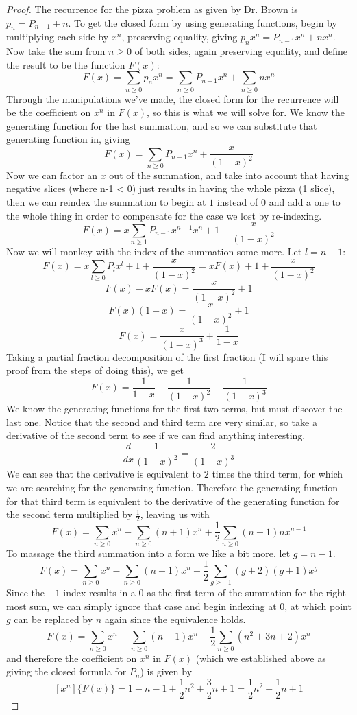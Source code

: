 \documentclass[12pt]{article}
\begin{document}
\begin{proof}
The recurrence for the pizza problem as given by Dr. Brown is $p_n=P_{n-1}+n$. To get the closed form by using generating functions, begin by multiplying each side by $x^n$, preserving equality, giving $p_nx^n=P_{n-1}x^n+nx^n$. Now take the sum from $n \geq 0$ of both sides, again preserving equality, and define the result to be the function $F(x)$:
\[F(x)=\sum_{n \geq 0}p_nx^n=\sum_{n \geq 0}P_{n-1}x^n+\sum_{n \geq 0}nx^n\]
Through the manipulations we've made, the closed form for the recurrence will be the coefficient on $x^n$ in $F(x)$, so this is what we will solve for. We know the generating function for the last summation, and so we can substitute that generating function in, giving
\[F(x)=\sum_{n \geq 0}P_{n-1}x^n+\frac{x}{(1-x)^2}\]
Now we can factor an $x$ out of the summation, and take into account that having negative slices (where n-1 < 0) just results in having the whole pizza (1 slice), then we can reindex the summation to begin at $1$ instead of $0$ and add a one to the whole thing in order to compensate for the case we lost by re-indexing.
\[F(x)=x\sum_{n \geq 1}P_{n-1}x^{n-1}x^n+1+\frac{x}{(1-x)^2}\]
Now we will monkey with the index of the summation some more. Let $l=n-1$:
\[F(x)=x\sum_{l \geq 0}P_lx^l+1+\frac{x}{(1-x)^2} = xF(x)+1+\frac{x}{(1-x)^2}\]
\[F(x)-xF(x)=\frac{x}{(1-x)^2}+1\]
\[F(x)(1-x)=\frac{x}{(1-x)^2}+1\]
\[F(x)=\frac{x}{(1-x)^3}+\frac{1}{1-x}\]
Taking a partial fraction decomposition of the first fraction (I will spare this proof from the steps of doing this), we get
\[F(x)=\frac{1}{1-x}-\frac{1}{(1-x)^2}+\frac{1}{(1-x)^3}\]
We know the generating functions for the first two terms, but must discover the last one. Notice that the second and third term are very similar, so take a derivative of the second term to see if we can find anything interesting.
\[\frac{d}{dx}\frac{1}{(1-x)^2}=\frac{2}{(1-x)^3}\]
We can see that the derivative is equivalent to $2$ times the third term, for which we are searching for the generating function. Therefore the generating function for that third term is equivalent to the derivative of the generating function for the second term multiplied by $\frac{1}{2}$, leaving us with
\[F(x)=\sum_{n \geq 0}x^n-\sum_{n \geq 0}(n+1)x^n+\frac{1}{2}\sum_{n \geq 0}(n+1)nx^{n-1}\]
To massage the third summation into a form we like a bit more, let $g=n-1$.
\[F(x)=\sum_{n \geq 0}x^n-\sum_{n \geq 0}(n+1)x^n+\frac{1}{2}\sum_{g \geq -1}(g+2)(g+1)x^{g}\]
Since the $-1$ index results in a $0$ as the first term of the summation for the right-most sum, we can simply ignore that case and begin indexing at 0, at which point $g$ can be replaced by $n$ again since the equivalence holds.
\[F(x)=\sum_{n \geq 0}x^n-\sum_{n \geq 0}(n+1)x^n+\frac{1}{2}\sum_{n \geq 0}(n^2+3n+2)x^{n}\]
and therefore the coefficient on $x^n$ in $F(x)$ (which we established above as giving the closed formula for $P_n$) is given by
\[[x^n]\{F(x)\}=1-n-1+\frac{1}{2}n^2+\frac{3}{2}n+1=\frac{1}{2}n^2+\frac{1}{2}n+1\]
\end{proof}
\end{document}
